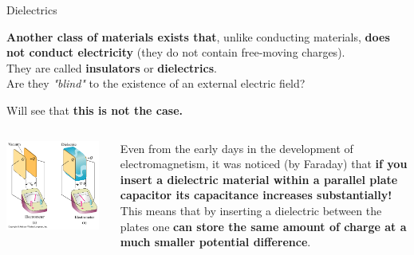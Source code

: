 %
%
%

\begin{frame}{Dielectrics}

{\bf Another class of materials exists that}, unlike conducting materials, {\bf does not conduct electricity}
(they do not contain free-moving charges).\\
\vspace{0.2cm}
They are called {\bf insulators} or {\bf dielectrics}.\\
\vspace{0.2cm}
Are they {\em "blind"} to the existence of an external electric field?\\
\vspace{0.3cm}

Will see that {\bf this is not the case.}\\

\begin{columns}
  \begin{column}{0.40\textwidth}
   \begin{center}
     \includegraphics[width=0.95\textwidth]{./images/schematics/parallel_plate_capacitor_with_and_without_dielectric_1.jpg}\\
   \end{center}
  \end{column}
  \begin{column}{0.60\textwidth}
  {\small
    Even from the early days in the development of electromagnetism,
    it was noticed (by Faraday) that {\bf if you insert a dielectric material within a parallel plate capacitor
    its capacitance increases substantially!}\\
    \vspace{0.2cm}
    This means that by inserting a dielectric between the plates
    one {\bf can store the same amount of charge at a much smaller potential difference}.
  }
  \end{column}
\end{columns}

\end{frame}


